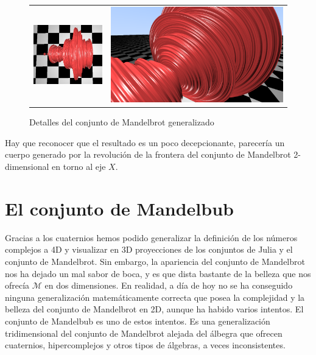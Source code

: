 \begin{figure}[ht]
\begin{tabular}{cc}
    \includegraphics[scale=0.4]{img/C8/mandelbrot-3.png} &     \includegraphics[scale=0.25]{img/C8/mandelbrot-4.png} \\
    \end{tabular}
    \caption{Detalles del conjunto de Mandelbrot generalizado}
    \label{fig:mandelbrot-3D}
\end{figure}

Hay que reconocer que el resultado es un poco decepcionante, parecería un cuerpo generado por la revolución de la frontera del conjunto de Mandelbrot 2-dimensional en torno al eje $X$.

\section{El conjunto de Mandelbub}

Gracias a los cuaternios hemos podido generalizar la definición de los números complejos a 4D y visualizar en 3D proyecciones de los conjuntos de Julia y el conjunto de Mandelbrot. Sin embargo, la apariencia del conjunto de Mandelbrot nos ha dejado un mal sabor de boca, y es que dista bastante de la belleza que nos ofrecía $\mathcal{M}$ en dos dimensiones. En realidad, a día de hoy no se ha conseguido ninguna generalización matemáticamente correcta que posea la complejidad y la belleza del conjunto de Mandelbrot en 2D, aunque ha habido varios intentos. El conjunto de Mandelbub es uno de estos intentos. Es una generalización tridimensional del conjunto de Mandelbrot alejada del álbegra que ofrecen cuaternios, hipercomplejos y otros tipos de álgebras, a veces inconsistentes. 

